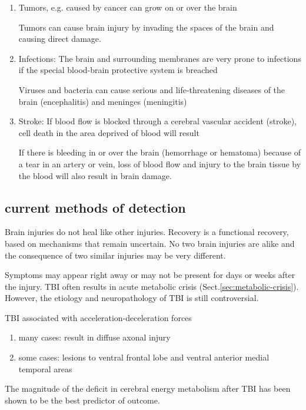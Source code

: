 \begin{enumerate}
  \item Tumors, e.g. caused by cancer can grow on or over the brain

Tumors can cause brain injury by invading the spaces of the brain and causing
direct damage.


  \item Infections: The brain and surrounding membranes are very prone to
  infections if the special blood-brain protective system is breached

Viruses and bacteria can cause serious and life-threatening diseases of the
brain (encephalitis) and meninges (meningitis)


  \item Stroke: If blood flow is blocked through a cerebral vascular accident
  (stroke), cell death in the area deprived of blood will result


If there is bleeding in or over the brain (hemorrhage or hematoma) because of a
tear in an artery or vein, loss of blood flow and injury to the brain tissue by
the blood will also result in brain damage.


\end{enumerate}


\subsection{current methods of detection}
\label{sec:TBI-detection}

Brain injuries do not heal like other injuries. Recovery is a functional
recovery, based on mechanisms that remain uncertain. No two brain injuries are
alike and the consequence of two similar injuries may be very different.

Symptoms may appear right away or may not be present for days or weeks after the
injury. TBI often results in acute metabolic crisis
(Sect.\ref{sec:metabolic-crisis}). However, the etiology and neuropathology of
TBI is still controversial.

TBI associated with acceleration-deceleration forces
\begin{enumerate}
  \item many cases: result in diffuse axonal injury

  \item some cases: lesions to ventral frontal lobe and ventral anterior medial
  temporal areas
\end{enumerate}

The magnitude of the deficit in cerebral energy metabolism after TBI has been
shown to be the best predictor of outcome.

